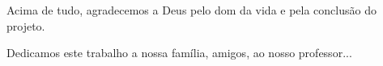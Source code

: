 
\begin{agradecimentos}

Acima de tudo, agradecemos a Deus pelo dom da vida e pela conclusão do projeto.

Dedicamos este trabalho a nossa família, amigos, ao nosso professor...

\end{agradecimentos}



